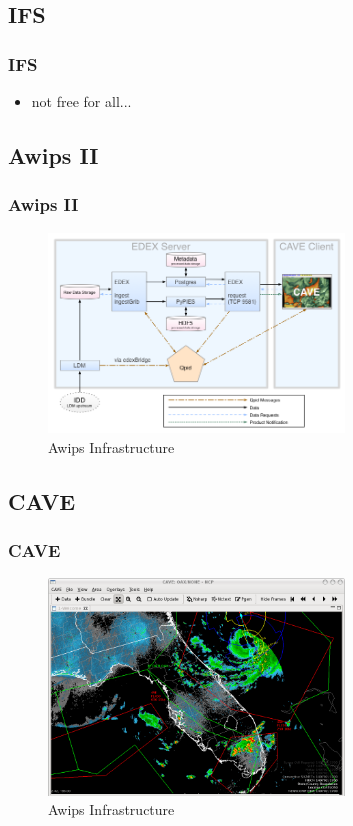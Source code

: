 \documentclass[compress]{beamer}
\begin{document}
\subsection{IFS}
\begin{frame}
	\frametitle{IFS}
	\begin{itemize}
		\item not free for all...
	\end{itemize}
\end{frame}

\subsection{Awips II}
\begin{frame}
    \frametitle{Awips II}
    \begin{center}
    	\begin{figure}
			\includegraphics[width=0.7\textwidth]{gfx/awipsII.png}
      	  	\caption[]{Awips Infrastructure \cite{Uni01}}
		\end{figure}
	\end{center}
\end{frame}

\subsection{CAVE}
\begin{frame}
    \frametitle{CAVE}
    \begin{center}
    	\begin{figure}
			\includegraphics[width=0.7\textwidth]{gfx/Unidata_AWIPS2_CAVE.png}
      	  	\caption[]{Awips Infrastructure \cite{Uni01}}
		\end{figure}
	\end{center}

\end{frame}
\end{document}
